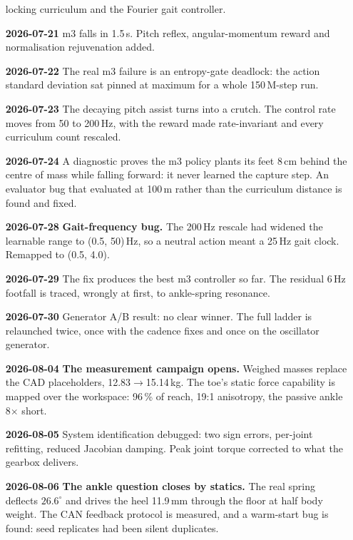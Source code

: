 \begin{itemize}[leftmargin=1.2cm,label={}]
        locking curriculum and the Fourier gait controller.
  \item[\textbf{2026-07-21}] m3 falls in 1.5\,s. Pitch reflex, angular-momentum reward and
        normalisation rejuvenation added.
  \item[\textbf{2026-07-22}] The real m3 failure is an entropy-gate deadlock: the action standard
        deviation sat pinned at maximum for a whole 150\,M-step run.
  \item[\textbf{2026-07-23}] The decaying pitch assist turns into a crutch. The control rate moves
        from 50 to 200\,Hz, with the reward made rate-invariant and every curriculum count
        rescaled.
  \item[\textbf{2026-07-24}] A diagnostic proves the m3 policy plants its feet 8\,cm behind the
        centre of mass while falling forward: it never learned the capture step. An evaluator bug
        that evaluated at 100\,m rather than the curriculum distance is found and fixed.
  \item[\textbf{2026-07-28}] \textbf{Gait-frequency bug.} The 200\,Hz rescale had widened the
        learnable range to (0.5, 50)\,Hz, so a neutral action meant a 25\,Hz gait clock. Remapped
        to (0.5, 4.0).
  \item[\textbf{2026-07-29}] The fix produces the best m3 controller so far. The residual 6\,Hz
        footfall is traced, wrongly at first, to ankle-spring resonance.
  \item[\textbf{2026-07-30}] Generator A/B result: no clear winner. The full ladder is relaunched
        twice, once with the cadence fixes and once on the oscillator generator.
  \item[\textbf{2026-08-04}] \textbf{The measurement campaign opens.} Weighed masses replace the
        CAD placeholders, 12.83$\to$15.14\,kg. The toe's static force capability is mapped over the
        workspace: 96\,\% of reach, 19:1 anisotropy, the passive ankle 8$\times$ short.
  \item[\textbf{2026-08-05}] System identification debugged: two sign errors, per-joint refitting,
        reduced Jacobian damping. Peak joint torque corrected to what the gearbox delivers.
  \item[\textbf{2026-08-06}] \textbf{The ankle question closes by statics.} The real spring
        deflects $26.6^{\circ}$ and drives the heel 11.9\,mm through the floor at half body weight.
        The CAN feedback protocol is measured, and a warm-start bug is found: seed replicates had
        been silent duplicates.

\end{itemize}
